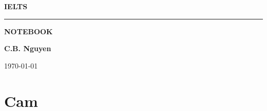 \documentclass[11pt]{article}
\begin{document}
\begin{titlepage}
\centering
\phantom{}\par
\vspace{3cm}
{\LARGE\textbf{IELTS}\par}
\vspace{1cm}
\rule{5cm}{0.5pt}\par
\vspace{1cm}
{\LARGE\textbf{NOTEBOOK}\par}
\vspace{1cm}
\Large\textbf{C.B. Nguyen}\par		
\vspace{1cm}
\today
\end{titlepage}
\tableofcontents

\section{Cam}
\end{document}
